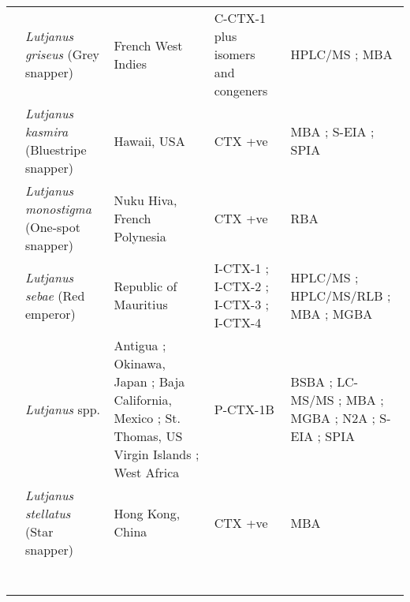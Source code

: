 \documentclass[12pt]{article}
\begin{document}
\begin{longtable}{  | p{2cm} | p{3cm} | p{4.5cm}  | p{2cm} | p{3cm}  | }
  &  \emph{Lutjanus griseus} (Grey snapper) & French West Indies \cite{pottier2002analysis} & C-CTX-1 plus isomers and congeners \cite{pottier2002analysis} & HPLC/MS \cite{pottier2002analysis}; MBA \cite{pottier2002analysis}\\
  & \emph{Lutjanus kasmira} (Bluestripe snapper) & Hawaii, USA \cite{hokama1985rapid} & CTX +ve \cite{hokama1985rapid}  & MBA \cite{hokama1985rapid}; S-EIA \cite{hokama1985rapid}; SPIA \cite{hokama1985rapid} \\
  & \emph{Lutjanus monostigma} (One-spot snapper)& Nuku Hiva, French Polynesia \cite{darius2007ciguatera} & CTX +ve \cite{darius2007ciguatera}  & RBA \cite{darius2007ciguatera} \\
  &  \emph{Lutjanus sebae} (Red emperor) & Republic of Mauritius \cite{hamilton2002multiple,hamilton2002isolation} & I-CTX-1 \cite{hamilton2002multiple,hamilton2002isolation}; I-CTX-2 \cite{hamilton2002multiple,hamilton2002isolation}; I-CTX-3 \cite{hamilton2002multiple,hamilton2002isolation}; I-CTX-4 \cite{hamilton2002multiple,hamilton2002isolation} & HPLC/MS \cite{hamilton2002multiple,hamilton2002isolation}; HPLC/MS/RLB \cite{hamilton2002multiple,hamilton2002isolation}; MBA \cite{hamilton2002multiple,hamilton2002isolation}; MGBA \cite{hamilton2002multiple,hamilton2002isolation} \\ %
  & \emph{Lutjanus} spp. & Antigua \cite{hokama1990simplified}; Okinawa, Japan \cite{yogi2011detailed}; Baja California, Mexico \cite{parrilla1992outbreaks}; St. Thomas, US Virgin Islands \cite{granade1976ciguatera}; West Africa \cite{bienfang2008ciguatera} & P-CTX-1B \cite{yogi2011detailed} & BSBA \cite{granade1976ciguatera}; LC-MS/MS \cite{yogi2011detailed}; MBA \cite{parrilla1992outbreaks}; MGBA \cite{granade1976ciguatera}; N2A \cite{bienfang2008ciguatera}; S-EIA \cite{hokama1990simplified}; SPIA \cite{hokama1990simplified} \\
  & \emph{Lutjanus stellatus} (Star snapper) & Hong Kong, China \cite{wong2008features} & CTX +ve \cite{wong2008features} & MBA \cite{wong2008features} \\
  \hline	
  &  \emph{} &  &  & \\
  & \emph{}  &  &  & \\
  & \emph{} &  &  & \\
  &  \emph{} &  &  & \\
  & \emph{}  &  &  & \\
  & \emph{} &  &  & \\
  &  \emph{} &  &  & \\

\end{longtable}
\end{document}
